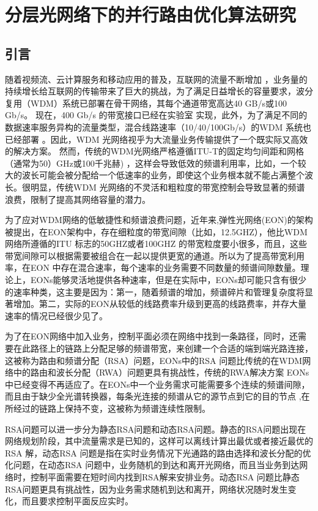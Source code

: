 
\chapter{分层光网络下的并行路由优化算法研究}
\section{引言}
随着视频流、云计算服务和移动应用的普及，互联网的流量不断增加 ，业务量的持续增长给互联网的传输带来了巨大的挑战，为了满足日益增长的容量要求，波分复用（WDM）系统已部署在骨干网络，其每个通道带宽高达40 GB/s或100 Gb/s。 现在，400 Gb/s 的带宽接口已经在实验室  实现，此外，为了满足不同的数据速率服务异构的流量类型，混合线路速率（10/40/100Gb/s）的WDM 系统也已经部署 。因此，WDM 光网络视乎为大流量业务传输提供了一个既实际又高效的解决方案。
然而，传统的WDM光网络严格遵循ITU-T的固定均匀间距和网格（通常为50）GHz或100千兆赫) ，这样会导致低效的频谱利用率，比如，一个较大的波长可能会被分配给一个低速率的业务，即使这个业务根本就不能占满整个波长。很明显，传统WDM 光网络的不灵活和粗粒度的带宽控制会导致显著的频谱浪费，限制了提高其网络容量的潜力。

为了应对WDM网络的低敏捷性和频谱浪费问题，近年来,弹性光网络(EON)的架构被提出，在EON架构中，存在细粒度的带宽间隙（比如，12.5GHZ），他比WDM 网络所遵循的ITU 标志的50GHZ或者100GHZ 的带宽粒度要小很多，而且，这些带宽间隙可以根据需要被组合在一起以提供更宽的通道。所以为了提高带宽利用率，在EON 中存在混合速率，每个速率的业务需要不同数量的频谱间隙数量。理论上，EONs能够灵活地提供各种速率，但是在实际中，EONs却可能只含有很少的速率种类，这主要是因为：第一，随着频谱的增加，频谱碎片和管理复杂度将显著增加。第二，实际的EON从较低的线路费率升级到更高的线路费率，并存大量速率的情况已经很少见了。

为了在EON网络中加入业务，控制平面必须在网络中找到一条路径，同时，还需要在此路径上的链路上分配足够的频谱带宽，来创建一个合适的端到端光路连接，这被称为路由和频谱分配（RSA）问题，EONs中的RSA 问题比传统的在WDM网络中的路由和波长分配（RWA）问题更具有挑战性，传统的RWA解决方案 EONs中已经变得不再适应了。在EONs中一个业务需求可能需要多个连续的频谱间隙，而且由于缺少全光谱转换器，每条光连接的频谱从它的源节点到它的目的节点 ,在所经过的链路上保持不变，这被称为频谱连续性限制。

RSA问题可以进一步分为静态RSA问题和动态RSA问题。静态的RSA问题出现在网络规划阶段，其中流量需求是已知的，这样可以离线计算出最优或者接近最优的RSA 解，动态RSA 问题是指在实时业务情况下光通路的路由选择和波长分配的优化问题，在动态RSA 问题中，业务随机的到达和离开光网络，而且当业务到达网络时，控制平面需要在短时间内找到RSA解来安排业务。动态RSA 问题比静态RSA问题更具有挑战性，因为业务需求随机到达和离开，网络状况随时发生变化，而且要求控制平面反应实时。

